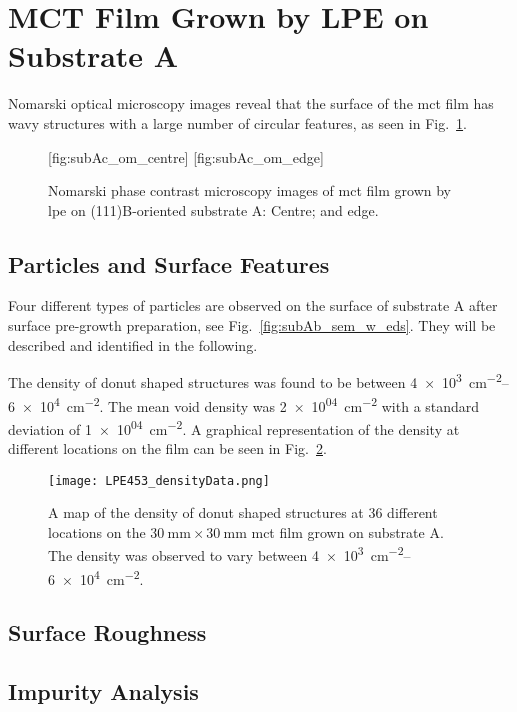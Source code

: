 \clearpage
\section{MCT Film Grown by LPE on Substrate A}\label{sec:subAc}

Nomarski optical microscopy images reveal that the surface of the \ac{mct} film has wavy structures with a large number of circular features, as seen in Fig.~\ref{fig:subAc_om}.

\begin{figure}[htbp]
    \centering
    [fig:subAc_om_centre]
    \hfill
    [fig:subAc_om_edge]
    \caption[Nomarski phase contrast microscopy images of \ac{mct} film grown by \ac{lpe} on substrate A.]{Nomarski phase contrast microscopy images of \ac{mct} film grown by \ac{lpe} on (111)B-oriented substrate A:  Centre; and  edge.}
    \label{fig:subAc_om}
\end{figure}

\subsection{Particles and Surface Features}
Four different types of particles are observed on the surface of substrate A after surface pre-growth preparation, see Fig.~\ref{fig:subAb_sem_w_eds}. They will be described and identified in the following.

The density of donut shaped structures was found to be between \SIrange{4e+3}{6e+4}{\centi\metre^{-2}}. The mean void density was \SI{2e+04}{\centi\metre^{-2}} with a standard deviation of \SI{1e+04}{\centi\metre^{-2}}. A graphical representation of the density at different locations on the film can be seen in Fig.~\ref{fig:LPE453_densityData}.

\begin{figure}[htbp]
    \centering
    \texttt{[image: LPE453\_densityData.png]}
    \caption[Map of the density of donut shaped structures on the \ac{mct} film grown on substrate A.]{A map of the density of donut shaped structures at 36 different locations on the $\SI{30}{\milli\metre}\times\SI{30}{\milli\metre}$ \ac{mct} film grown on substrate A. The density was observed to vary between \SIrange{4e+3}{6e+4}{\centi\metre^{-2}}.}
    \label{fig:LPE453_densityData}
\end{figure}

\subsection{Surface Roughness}

\subsection{Impurity Analysis}

